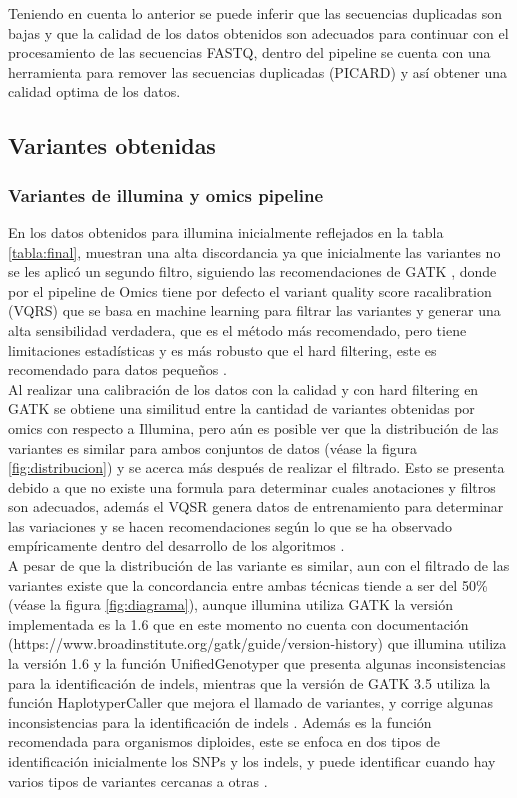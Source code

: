 Teniendo en cuenta lo anterior se puede inferir que las secuencias duplicadas son bajas y que la calidad de los datos obtenidos son adecuados para continuar con el procesamiento de las secuencias FASTQ, dentro del pipeline se cuenta con una herramienta para remover las secuencias duplicadas (PICARD) y así obtener una calidad optima de los datos.

\subsection{Variantes obtenidas}
\subsubsection{Variantes de illumina y omics pipeline}

En los datos obtenidos para illumina inicialmente reflejados en la tabla \ref{tabla:final}, muestran una alta discordancia ya que inicialmente las variantes no se les aplicó un segundo filtro, siguiendo las recomendaciones de  GATK , donde por el pipeline de Omics tiene por defecto el variant quality score racalibration (VQRS) que se basa en machine learning para filtrar las variantes y generar una alta sensibilidad verdadera, que es el método más recomendado, pero tiene limitaciones estadísticas y es más robusto que el hard filtering, este es recomendado para datos pequeños \cite{Auwera2014}. \\

Al realizar una calibración de los datos con la calidad y con hard filtering en GATK se obtiene una similitud entre la cantidad de variantes obtenidas por omics con respecto a Illumina, pero aún es posible ver que la distribución de las variantes es similar para ambos conjuntos de datos (véase la figura \ref{fig:distribucion}) y se acerca más después de realizar el filtrado. Esto se presenta debido a que no existe una formula para determinar cuales anotaciones y filtros son adecuados, además el VQSR genera datos de entrenamiento para determinar las variaciones y se hacen recomendaciones según lo que se ha observado empíricamente dentro del desarrollo de los algoritmos \cite{Auwera2014}. \\

A pesar de que la distribución de las variante es similar, aun con el filtrado de las variantes existe que la concordancia entre ambas técnicas tiende a ser del 50\% (véase la figura \ref{fig:diagrama}), aunque illumina utiliza GATK la versión implementada es la 1.6 que en este momento no cuenta con documentación (https://www.broadinstitute.org/gatk/guide/version-history) que illumina utiliza la versión 1.6 y la función UnifiedGenotyper que presenta algunas inconsistencias para la identificación de indels, mientras que la versión de GATK 3.5 utiliza la función HaplotyperCaller que mejora el llamado de variantes, y corrige algunas inconsistencias para la identificación de indels \cite{ORawe2013}. Además es la función recomendada para organismos diploides, este se enfoca en dos tipos de identificación inicialmente los SNPs y los indels, y puede identificar cuando hay varios tipos de variantes cercanas a otras \cite{Auwera2014}. \\

